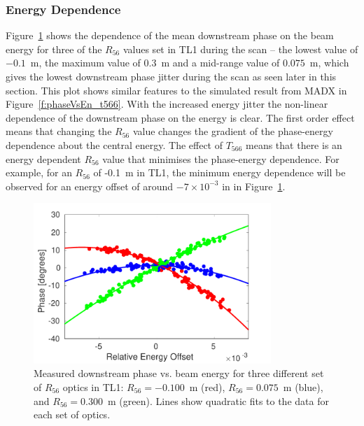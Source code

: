 \subsubsection{Energy Dependence}

Figure~\ref{f:R56ScanGunWiggle_PhaseVsEnergy} shows the dependence of the mean downstream phase on the beam energy for three of the \(R_{56}\) values set in TL1 during the scan -- the lowest value of \(-0.1\)~m, the maximum value of \(0.3\)~m and a mid-range value of \(0.075\)~m, which gives the lowest downstream phase jitter during the scan as seen later in this section. This plot shows similar features to the simulated result from MADX in Figure~\ref{f:phaseVsEn_t566}. With the increased energy jitter the non-linear dependence of the downstream phase on the energy is clear. The first order effect means that changing the \(R_{56}\) value changes the gradient of the phase-energy dependence about the central energy. The effect of \(T_{566}\) means that there is an energy dependent \(R_{56}\) value that minimises the phase-energy dependence. For example, for an \(R_{56}\) of -0.1~m in TL1, the minimum energy dependence will be observed for an energy offset of around \(-7\times10^{-3}\) in in Figure~\ref{f:R56ScanGunWiggle_PhaseVsEnergy}.

\begin{figure}
  \centering
  \includegraphics[width=0.8\textwidth]{Figures/propagation/R56ScanGunWiggle_PhaseVsEnergy}
  \caption{Measured downstream phase vs. beam energy for three different set of \(R_{56}\) optics in TL1: \(R_{56}=-0.100\)~m (red), \(R_{56}=0.075\)~m (blue), and \(R_{56}=0.300\)~m (green). Lines show quadratic fits to the data for each set of optics.}
  \label{f:R56ScanGunWiggle_PhaseVsEnergy}
\end{figure}

